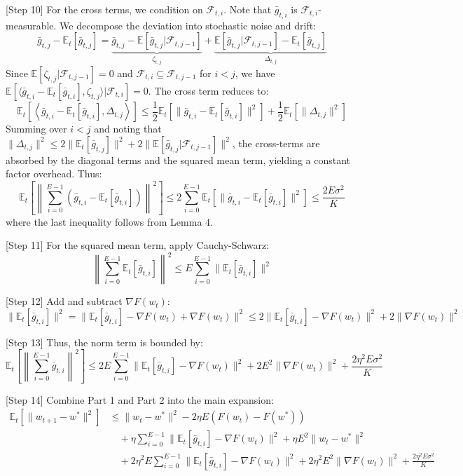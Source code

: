 \documentclass{article}
\begin{document}
[Step 10] For the cross terms, we condition on $\mathcal{F}_{t,i}$. Note that $\bar{g}_{t,i}$ is $\mathcal{F}_{t,i}$-measurable. We decompose the deviation into stochastic noise and drift:
$$ \bar{g}_{t,j} - \mathbb{E}_t[\bar{g}_{t,j}] = \underbrace{\bar{g}_{t,j} - \mathbb{E}[\bar{g}_{t,j} | \mathcal{F}_{t,j-1}]}_{\zeta_{t,j}} + \underbrace{\mathbb{E}[\bar{g}_{t,j} | \mathcal{F}_{t,j-1}] - \mathbb{E}_t[\bar{g}_{t,j}]}_{\Delta_{t,j}} $$
Since $\mathbb{E}[\zeta_{t,j} | \mathcal{F}_{t,j-1}] = 0$ and $\mathcal{F}_{t,i} \subseteq \mathcal{F}_{t,j-1}$ for $i < j$, we have $\mathbb{E}[\langle \bar{g}_{t,i} - \mathbb{E}_t[\bar{g}_{t,i}], \zeta_{t,j} \rangle | \mathcal{F}_{t,i}] = 0$. The cross term reduces to:
$$ \mathbb{E}_t\left[ \left\langle \bar{g}_{t,i} - \mathbb{E}_t[\bar{g}_{t,i}], \Delta_{t,j} \right\rangle \right] \leq \frac{1}{2}\mathbb{E}_t[\|\bar{g}_{t,i} - \mathbb{E}_t[\bar{g}_{t,i}]\|^2] + \frac{1}{2}\mathbb{E}_t[\|\Delta_{t,j}\|^2] $$
Summing over $i<j$ and noting that $\|\Delta_{t,j}\|^2 \leq 2\|\mathbb{E}_t[\bar{g}_{t,j}]\|^2 + 2\|\mathbb{E}[\bar{g}_{t,j}|\mathcal{F}_{t,j-1}]\|^2$, the cross-terms are absorbed by the diagonal terms and the squared mean term, yielding a constant factor overhead. Thus:
$$ \mathbb{E}_t\left[ \left\| \sum_{i=0}^{E-1} \left( \bar{g}_{t,i} - \mathbb{E}_t[\bar{g}_{t,i}] \right) \right\|^2 \right] \leq 2\sum_{i=0}^{E-1} \mathbb{E}_t[\|\bar{g}_{t,i} - \mathbb{E}_t[\bar{g}_{t,i}]\|^2] \leq \frac{2E\sigma^2}{K} $$
where the last inequality follows from Lemma 4.

[Step 11] For the squared mean term, apply Cauchy-Schwarz:
$$ \left\| \sum_{i=0}^{E-1} \mathbb{E}_t[\bar{g}_{t,i}] \right\|^2 \leq E \sum_{i=0}^{E-1} \|\mathbb{E}_t[\bar{g}_{t,i}]\|^2 $$

[Step 12] Add and subtract $\nabla F(w_t)$:
$$ \|\mathbb{E}_t[\bar{g}_{t,i}]\|^2 = \|\mathbb{E}_t[\bar{g}_{t,i}] - \nabla F(w_t) + \nabla F(w_t)\|^2 \leq 2\|\mathbb{E}_t[\bar{g}_{t,i}] - \nabla F(w_t)\|^2 + 2\|\nabla F(w_t)\|^2 $$

[Step 13] Thus, the norm term is bounded by:
$$ \mathbb{E}_t\left[ \left\| \sum_{i=0}^{E-1} \bar{g}_{t,i} \right\|^2 \right] \leq 2E \sum_{i=0}^{E-1} \|\mathbb{E}_t[\bar{g}_{t,i}] - \nabla F(w_t)\|^2 + 2E^2 \|\nabla F(w_t)\|^2 + \frac{2\eta^2 E \sigma^2}{K} $$

[Step 14] Combine Part 1 and Part 2 into the main expansion:
\begin{align*}
\mathbb{E}_t[\|w_{t+1} - w^*\|^2] &\leq \|w_t - w^*\|^2 - 2\eta E (F(w_t) - F(w^*)) \\
&\quad + \eta \sum_{i=0}^{E-1} \|\mathbb{E}_t[\bar{g}_{t,i}] - \nabla F(w_t)\|^2 + \eta E^2 \|w_t - w^*\|^2 \\
&\quad + 2\eta^2 E \sum_{i=0}^{E-1} \|\mathbb{E}_t[\bar{g}_{t,i}] - \nabla F(w_t)\|^2 + 2\eta^2 E^2 \|\nabla F(w_t)\|^2 + \frac{2\eta^2 E \sigma^2}{K}
\end{align*}
\end{document}
